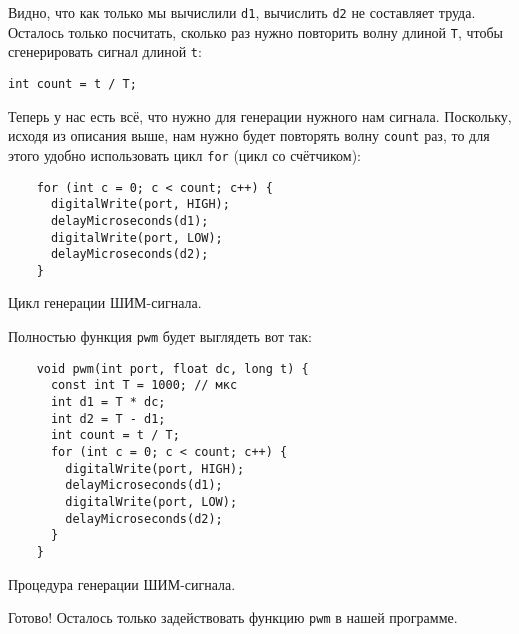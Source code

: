 \documentclass[../sparc.tex]{subfiles}
\begin{document}
Видно, что как только мы вычислили \texttt{d1}, вычислить \texttt{d2} не
составляет труда. Осталось только посчитать, сколько раз нужно повторить волну
длиной \texttt{T}, чтобы сгенерировать сигнал длиной \texttt{t}:

\begin{verbatim}
int count = t / T;
\end{verbatim}

Теперь у нас есть всё, что нужно для генерации нужного нам сигнала. Поскольку,
исходя из описания выше, нам нужно будет повторять волну \texttt{count} раз, то
для этого удобно использовать цикл \texttt{for} (цикл со счётчиком):

\begin{listing}[H]
  \begin{verbatim}
    for (int c = 0; c < count; c++) {
      digitalWrite(port, HIGH);
      delayMicroseconds(d1);
      digitalWrite(port, LOW);
      delayMicroseconds(d2);
    }
  \end{verbatim}
  \label{listing:pwm-cycle}
  \caption{Цикл генерации ШИМ-сигнала.}
\end{listing}

Полностью функция \texttt{pwm} будет выглядеть вот так:

\begin{listing}[H]
  \begin{verbatim}
    void pwm(int port, float dc, long t) {
      const int T = 1000; // мкс
      int d1 = T * dc;
      int d2 = T - d1;
      int count = t / T;
      for (int c = 0; c < count; c++) {
        digitalWrite(port, HIGH);
        delayMicroseconds(d1);
        digitalWrite(port, LOW);
        delayMicroseconds(d2);
      }
    }
  \end{verbatim}
  \label{listing:pwm-procedure}
  \caption{Процедура генерации ШИМ-сигнала.}
\end{listing}

Готово! Осталось только задействовать функцию \texttt{pwm} в нашей программе.
\end{document}
